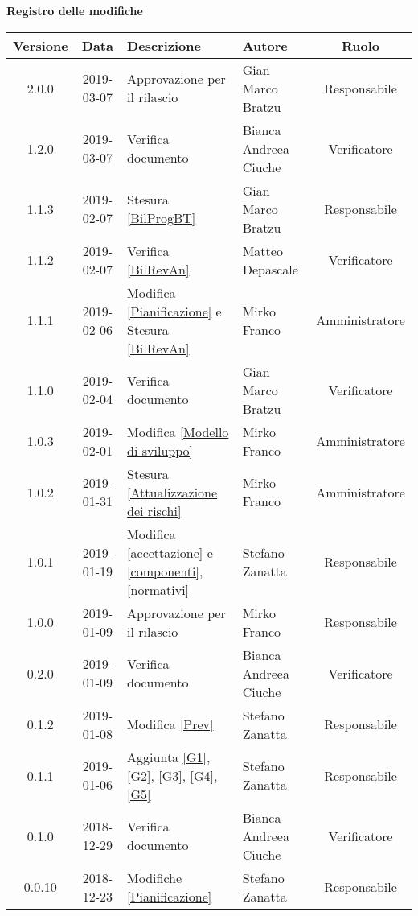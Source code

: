 	\begin{center}
		\textbf{Registro delle modifiche}
	\end{center}
	\begin{center}
		\begin{tabularx}{\textwidth}{|c|c|X|X|c|}
			\hline
			\textbf{Versione} & \textbf{Data} & \textbf{Descrizione} & \textbf{Autore} & \textbf{Ruolo} \\
			\hline
			2.0.0 & 2019-03-07 & Approvazione per il rilascio & Gian Marco Bratzu & Responsabile \\			
			\hline
			1.2.0 & 2019-03-07 & Verifica documento & Bianca Andreea Ciuche & Verificatore \\			
			\hline
			1.1.3 & 2019-02-07 & Stesura \cref{BilProgBT} & Gian Marco Bratzu & Responsabile \\			
			\hline
			1.1.2 & 2019-02-07 & Verifica \cref{BilRevAn} & Matteo Depascale & Verificatore \\
			\hline
			1.1.1 & 2019-02-06 & Modifica \cref{Pianificazione} e Stesura \cref{BilRevAn} & Mirko Franco & Amministratore \\
			\hline
			1.1.0 & 2019-02-04 & Verifica documento & Gian Marco Bratzu & Verificatore\\
			\hline
			1.0.3 & 2019-02-01 & Modifica \cref{Modello di sviluppo} & Mirko Franco & Amministratore \\
			\hline
			1.0.2 & 2019-01-31 & Stesura \cref{Attualizzazione dei rischi} & Mirko Franco & Amministratore \\
			\hline
			1.0.1 & 2019-01-19 & Modifica \cref{accettazione} e \cref{componenti},\cref{normativi} & Stefano Zanatta & Responsabile\\
			\hline
			1.0.0 & 2019-01-09 & Approvazione per il rilascio & Mirko Franco & Responsabile\\
			\hline
			0.2.0 & 2019-01-09 & Verifica documento & Bianca Andreea Ciuche& Verificatore\\
			\hline
			0.1.2 & 2019-01-08 & Modifica \cref{Prev}& Stefano Zanatta & Responsabile\\
			\hline
			0.1.1 & 2019-01-06 & Aggiunta \cref{G1}, \cref{G2}, \cref{G3}, \cref{G4}, \cref{G5} & Stefano Zanatta & Responsabile\\
			\hline
			0.1.0 & 2018-12-29 & Verifica documento & Bianca Andreea Ciuche& Verificatore\\
			\hline
			0.0.10 & 2018-12-23 & Modifiche \cref{Pianificazione} & Stefano Zanatta & Responsabile\\

\end{tabularx}
\end{center}
